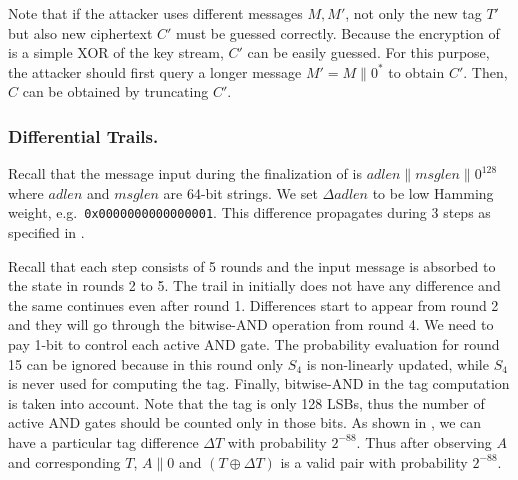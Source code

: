 Note that if the attacker uses different messages $M,M'$, not only the new tag $T'$ but also new ciphertext $C'$ must be guessed correctly. Because the encryption of \MORUS is a simple XOR of the key stream, $C'$ can be easily guessed. For this purpose, the attacker should first query a longer message $M'=M\|0^*$ to obtain $C'$. Then, $C$ can be obtained by truncating $C'$.

\subsubsection{Differential Trails.}
Recall that the message input during the finalization of \MORUS[1280] is $adlen\|msglen\|0^{128}$ where $adlen$ and $msglen$ are 64-bit strings. We set $\Delta adlen$ to be low Hamming weight, e.g.~{\tt 0x0000000000000001}. 
This difference propagates during 3 steps as specified in .

Recall that each step consists of 5 rounds and the input message is absorbed to the state in rounds 2 to 5. The trail in  initially does not have any difference and the same continues even after round 1. Differences start to appear from round 2 and they will go through the bitwise-AND operation from round 4. We need to pay 1-bit to control each active AND gate. The probability evaluation for round 15 can be ignored because in this round only $S_4$ is non-linearly updated, while $S_4$ is never used for computing the tag. Finally, bitwise-AND in the tag computation is taken into account. Note that the tag is only 128 LSBs, thus the number of active AND gates should be counted only in those bits. As shown in , we can have a particular tag difference $\Delta T$ with probability $2^{-88}$. Thus after observing $A$ and corresponding $T$, $A\|0$ and $(T \oplus \Delta T)$ is a valid pair with probability $2^{-88}$.


